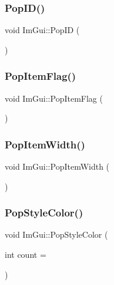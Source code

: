 \mbox{\label{namespace_im_gui_aba0b2d8f890a5d435ae43d0c4a2d4dd1}} 
\subsubsection{\texorpdfstring{Pop\+I\+D()}{PopID()}}
{\footnotesize\ttfamily void Im\+Gui\+::\+Pop\+ID (\begin{DoxyParamCaption}{ }\end{DoxyParamCaption})}

\mbox{\label{namespace_im_gui_aa93281155e1dd23715dbd384e91edc6b}} 
\subsubsection{\texorpdfstring{Pop\+Item\+Flag()}{PopItemFlag()}}
{\footnotesize\ttfamily void Im\+Gui\+::\+Pop\+Item\+Flag (\begin{DoxyParamCaption}{ }\end{DoxyParamCaption})}

\mbox{\label{namespace_im_gui_ad29a3fc0cb5dfc7f9fc7224512ce90bf}} 
\subsubsection{\texorpdfstring{Pop\+Item\+Width()}{PopItemWidth()}}
{\footnotesize\ttfamily void Im\+Gui\+::\+Pop\+Item\+Width (\begin{DoxyParamCaption}{ }\end{DoxyParamCaption})}

\mbox{\label{namespace_im_gui_a9795f730b4043a98b6254738d86efcdc}} 
\subsubsection{\texorpdfstring{Pop\+Style\+Color()}{PopStyleColor()}}
{\footnotesize\ttfamily void Im\+Gui\+::\+Pop\+Style\+Color (\begin{DoxyParamCaption}\item[{int}]{count = {} }\end{DoxyParamCaption})}

